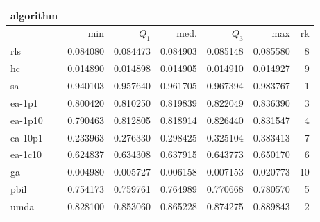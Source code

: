 \begin{tabular}{@{}l*{5}{>{{}}N{1}{3}}>{{}}N{2}{0}@{}}
\toprule
{algorithm} &  \\
\midrule
& {min} & {$Q_1$} & {med.} & {$Q_3$} & {max} & {rk}\\
\midrule
rls & 0.084080 & 0.084473 & 0.084903 & 0.085148 & 0.085580 & 8\\
hc & 0.014890 & 0.014898 & 0.014905 & 0.014910 & 0.014927 & 9\\
sa & {\color{blue}} 0.940103 & {\color{blue}} 0.957640 & {\color{blue}} 0.961705 & {\color{blue}} 0.967394 & {\color{blue}} 0.983767 & 1\\
ea-1p1 & 0.800420 & 0.810250 & 0.819839 & 0.822049 & 0.836390 & 3\\
ea-1p10 & 0.790463 & 0.812805 & 0.818914 & 0.826440 & 0.831547 & 4\\
ea-10p1 & 0.233963 & 0.276330 & 0.298425 & 0.325104 & 0.383413 & 7\\
ea-1c10 & 0.624837 & 0.634308 & 0.637915 & 0.643773 & 0.650170 & 6\\
ga & 0.004980 & 0.005727 & 0.006158 & 0.007153 & 0.020773 & 10\\
pbil & 0.754173 & 0.759761 & 0.764989 & 0.770668 & 0.780570 & 5\\
umda & 0.828100 & 0.853060 & 0.865228 & 0.874275 & 0.889843 & 2\\
\bottomrule
\end{tabular}

